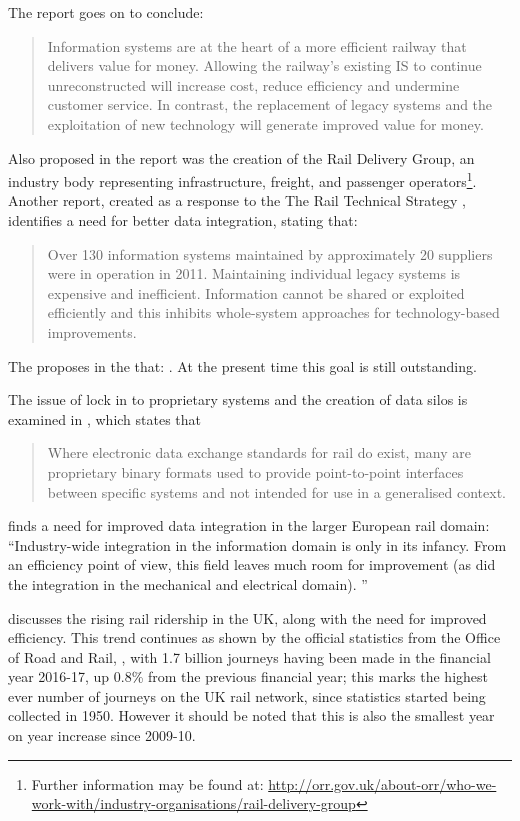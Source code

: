 The report goes on to conclude: 
\begin{quote}
Information systems are at the heart of a more efficient railway that delivers value for money. Allowing the railway’s existing IS to continue unreconstructed will increase cost, reduce efficiency and undermine customer service. In contrast, the replacement of legacy systems and the exploitation of new technology will generate improved value for money.
\end{quote}
Also proposed in the report was the creation of the Rail Delivery Group, an industry body representing infrastructure, freight, and passenger operators\footnote{Further information may be found at: \url{http://orr.gov.uk/about-orr/who-we-work-with/industry-organisations/rail-delivery-group}}. Another report, created as a response to the The Rail Technical Strategy \citep{TechnicalStrategyLeadershipGroup2012b}, identifies a need for better data integration, stating that:

\begin{quote}
Over 130 information systems maintained by approximately 20 suppliers were in operation in 2011. Maintaining individual legacy systems is expensive and inefficient. Information cannot be shared or exploited efficiently and this inhibits whole-system approaches for technology-based improvements. 
\end{quote}

The \citet{RDG2017} proposes in the  that: . At the present time this goal is still outstanding. 

The issue of lock in to proprietary systems and the creation of data silos is examined in \citet{Joh13}, which states that
\begin{quote}
    Where electronic data exchange standards for rail do exist, many are proprietary binary formats used to provide point-to-point interfaces between specific systems and not intended for use in a generalised context.
\end{quote}
\citet{Verstichel2011a} finds a need for improved data integration in the larger European rail domain: ``Industry-wide integration in the information domain is only in its infancy. From an efficiency point of view, this field leaves much room for improvement (as did the integration in the mechanical and electrical domain). ''

 \citet{Morris2014} discusses the rising rail ridership in the UK, along with the need for improved efficiency. This trend continues as shown by the official statistics from the Office of Road and Rail, \citet{OfficeofRoad&Rail2016}, with 1.7 billion journeys having been made in the financial year 2016-17, up 0.8\% from the previous financial year; this marks the highest ever number of journeys on the UK rail network, since statistics started being collected in 1950. However it should be noted that this is also the smallest year on year increase since 2009-10.

